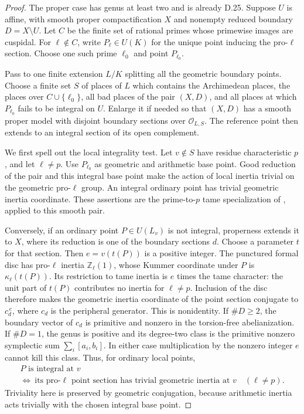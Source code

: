 \begin{proof}
The proper case has genus at least two and
is already D.25. Suppose \(U\) is affine,
with smooth proper compactification \(X\)
and nonempty reduced boundary \(D=X\setminus U\).
Let \(C\) be the finite set of rational
primes whose primewise images are cuspidal.
For \(\ell\notin C\), write \(P_\ell\in U(K)\)
for the unique point inducing the
pro-\(\ell\) section. Choose one such
prime \(\ell_0\) and point \(P_{\ell_0}\).

Pass to one finite extension \(L/K\)
splitting all the geometric boundary
points. Choose a finite set \(S\) of
places of \(L\) which contains the
Archimedean places, the places over
\(C\cup\{\ell_0\}\), all bad places
of the pair \((X,D)\), and all
places at which \(P_{\ell_0}\) fails
to be integral on \(U\).
Enlarge it if needed so that
\((X,D)\) has a smooth proper model
with disjoint boundary sections over
\(\mathcal O_{L,S}\).
The reference point then extends to
an integral section of its open
complement.

We first spell out the local
integrality test. Let \(v\notin S\)
have residue characteristic \(p\),
and let \(\ell\ne p\).
Use \(P_{\ell_0}\) as geometric
and arithmetic base point.
Good reduction of the pair and
this integral base point make
the action of local inertia
trivial on the geometric
pro-\(\ell\) group. An integral
ordinary point has trivial
geometric inertia coordinate.
These assertions are the
prime-to-\(p\) tame specialization
of \cite[Expos\'e XIII,
Corollary 2.9 and
\S\S2.10--2.12]{DE_SGA1},
applied to this smooth pair.

Conversely, if an ordinary point
\(P\in U(L_v)\) is not integral,
properness extends it to \(X\),
where its reduction is one of the
boundary sections \(d\).
Choose a parameter \(t\) for
that section. Then
\(e=v(t(P))\) is a positive
integer. The punctured formal
disc has pro-\(\ell\) inertia
\(\mathbb Z_\ell(1)\), whose
Kummer coordinate under \(P\)
is \(\kappa_\ell(t(P))\).
Its restriction to tame inertia
is \(e\) times the tame character:
the unit part of \(t(P)\)
contributes no inertia for
\(\ell\ne p\). Inclusion of
the disc therefore makes the
geometric inertia coordinate
of the point section conjugate
to \(c_d^{\,e}\), where \(c_d\)
is the peripheral generator.
This is nonidentity. If
\(\#D\ge2\), the boundary
vector of \(c_d\) is primitive
and nonzero in the torsion-free
abelianization. If \(\#D=1\),
the genus is positive and its
degree-two class is the
primitive nonzero symplectic
sum \(\sum_i[a_i,b_i]\).
In either case multiplication
by the nonzero integer \(e\)
cannot kill this class.
Thus, for ordinary local points,
\[
 \begin{gathered}
 P\text{ is integral at }v\\
 \Longleftrightarrow\
 \text{its pro-}\ell\text{ point section has
 trivial geometric inertia at }v
 \quad(\ell\ne p).
 \end{gathered}                                                 \tag{D.49.1}
\]
Triviality here is preserved
by geometric conjugation,
because arithmetic inertia
acts trivially with the chosen
integral base point.


\end{proof}
